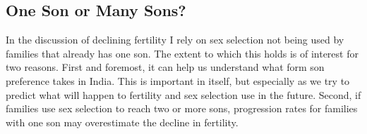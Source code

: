\documentclass[12pt,letterpaper]{article}
\begin{document}
% 




\subsection{One Son or Many Sons?}

In the discussion of declining fertility I rely on sex selection not being used by 
families that already has one son.
The extent to which this holds is of interest for two reasons.
First and foremost, it can help us understand what form son preference takes in India.
This is important in itself, but especially as we try to predict what will happen to 
fertility and sex selection use in the future.
Second,
if families use sex selection to reach two or more sons, progression rates for families 
with one son may overestimate the decline in fertility.
\end{document}
